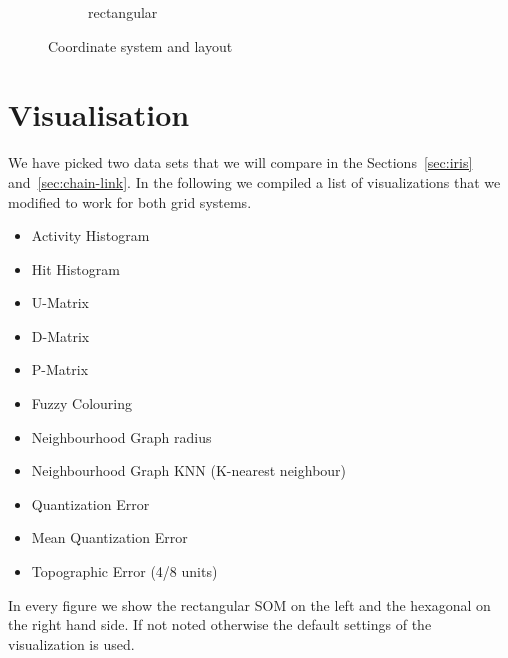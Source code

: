 \documentclass{acm_proc_article-sp}
\begin{document}
\begin{figure}
\begin{subfigure}{1\linewidth}
    \caption{rectangular}
    \label{fig:hci-coord-rect}
    \end{subfigure}
    \caption{Coordinate system and layout}
    \label{fig:coord}
\end{figure}

\section{Visualisation}

We have picked two data sets that we will compare in the Sections~\ref{sec:iris} and~\ref{sec:chain-link}. In the following we compiled a list of visualizations that we modified to work for both grid systems.

\begin{itemize}
	\item Activity Histogram
	\item Hit Histogram
	\item U-Matrix
	\item D-Matrix
	\item P-Matrix
	\item Fuzzy Colouring
	\item Neighbourhood Graph radius
	\item Neighbourhood Graph KNN (K-nearest neighbour)
	
	\item Quantization Error
	\item Mean Quantization Error
	\item Topographic Error (4/8 units)
\end{itemize}

In every figure we show the rectangular SOM on the left and the hexagonal on the right hand side.
If not noted otherwise the default settings of the visualization is used.

\newcommand{\cmprecthex}[5]
{
	\begin{figure}
		\begin{subfigure}{0.49\linewidth}
			\texttt{[image: img/\#1-\#2]}
			\caption{#5}
			\label{fig:#1-#2-rect}
		\end{subfigure}
		\begin{subfigure}{0.49\linewidth}
			\texttt{[image: img/\#1-\#2-hex]}
			\caption{#4}
			\label{fig:#1-#2-hex}
		\end{subfigure}
		\caption{#3}
		\label{fig:#1-#2}
	\end{figure}
}
\end{document}

